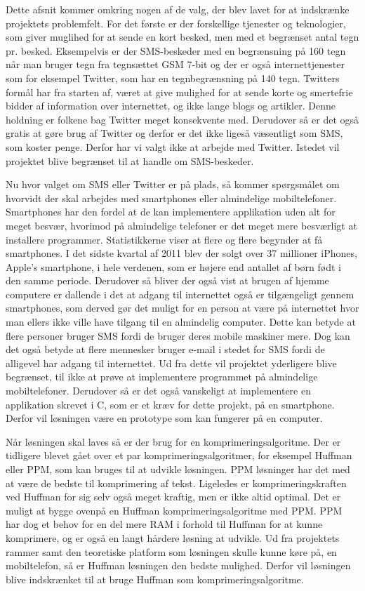 Dette afsnit kommer omkring nogen af de valg, der blev lavet for at indskrænke projektets problemfelt. For det første er der forskellige tjenester og teknologier, som giver muglihed for at sende en kort besked, men med et begrænset antal tegn pr. besked. Eksempelvis er der SMS-beskeder med en begrænsning på 160 tegn når man bruger tegn fra tegnsættet GSM 7-bit\cite{Pro_1} og der er også internettjenester som for eksempel Twitter, som har en tegnbegrænsning på 140 tegn\cite{pro_af1}. Twitters formål har fra starten af, været at give mulighed for at sende korte og smertefrie bidder af information over internettet, og ikke lange blogs og artikler. Denne holdning er folkene bag Twitter meget konsekvente med\cite{pro_af2}. Derudover så er det også gratis at gøre brug af Twitter og derfor er det ikke ligeså væsentligt som SMS, som koster penge. Derfor har vi valgt ikke at arbejde med Twitter. Istedet vil projektet blive begrænset til at handle om SMS-beskeder.

Nu hvor valget om SMS eller Twitter er på plads, så kommer spørgsmålet om hvorvidt der skal arbejdes med smartphones eller almindelige mobiltelefoner. Smartphones har den fordel at de kan implementere applikation uden alt for meget besvær, hvorimod på almindelige telefoner er det meget mere besværligt at installere programmer. Statistikkerne viser at flere og flere begynder at få smartphones\cite{pro_af3}. I det sidste kvartal af 2011 blev der solgt over 37 millioner iPhones, Apple's smartphone, i hele verdenen, som er højere end antallet af børn født i den samme periode\cite{pro_af4}. Derudover så bliver der også vist at brugen af hjemme computere er dallende i det at adgang til internettet også er tilgængeligt gennem smartphones, som derved gør det muligt for en person at være på internettet hvor man ellers ikke ville have tilgang til en almindelig computer\cite{pro_af3}. Dette kan betyde at flere personer bruger SMS fordi de bruger deres mobile maskiner mere. Dog kan det også betyde at flere mennesker bruger e-mail i stedet for SMS fordi de alligevel har adgang til internettet. Ud fra dette vil projektet yderligere blive begrænset, til ikke at prøve at implementere programmet på almindelige mobiltelefoner. Derudover så er det også vanskeligt at implementere en applikation skrevet i C, som er et kræv for dette projekt, på en smartphone. Derfor vil løsningen være en prototype som kan fungerer på en computer. 

Når løsningen skal laves så er der brug for en komprimeringsalgoritme. Der er tidligere blevet gået over et par komprimeringsalgoritmer, for eksempel Huffman eller PPM, som kan bruges til at udvikle løsningen. PPM løsninger har det med at være de bedste til komprimering af tekst. Ligeledes er komprimeringskraften ved Huffman for sig selv også meget kraftig, men er ikke altid optimal. Det er muligt at bygge ovenpå en Huffman komprimeringsalgoritme med PPM. PPM har dog et behov for en del mere RAM i forhold til Huffman for at kunne komprimere, og er også en langt hårdere løsning at udvikle. Ud fra projektets rammer samt den teoretiske platform som løsningen skulle kunne køre på, en mobiltelefon, så er Huffman løsningen den bedste mulighed. Derfor vil løsningen blive indskrænket til at bruge Huffman som komprimeringsalgoritme.\cite{pro_af5}

